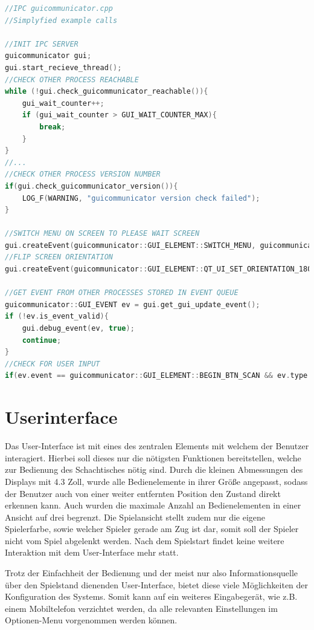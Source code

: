 \begin{lstlisting}[language={C++}]
//IPC guicommunicator.cpp
//Simplyfied example calls

//INIT IPC SERVER
guicommunicator gui;
gui.start_recieve_thread();
//CHECK OTHER PROCESS REACHABLE
while (!gui.check_guicommunicator_reachable()){
    gui_wait_counter++;
    if (gui_wait_counter > GUI_WAIT_COUNTER_MAX){
        break;
    }
}
//...
//CHECK OTHER PROCESS VERSION NUMBER
if(gui.check_guicommunicator_version()){
    LOG_F(WARNING, "guicommunicator version check failed");
}

//SWITCH MENU ON SCREEN TO PLEASE WAIT SCREEN
gui.createEvent(guicommunicator::GUI_ELEMENT::SWITCH_MENU, guicommunicator::GUI_VALUE_TYPE::PROCESSING_SCREEN);
//FLIP SCREEN ORIENTATION
gui.createEvent(guicommunicator::GUI_ELEMENT::QT_UI_SET_ORIENTATION_180, guicommunicator::GUI_VALUE_TYPE::ENABLED);

//GET EVENT FROM OTHER PROCESSES STORED IN EVENT QUEUE
guicommunicator::GUI_EVENT ev = gui.get_gui_update_event();
if (!ev.is_event_valid){
    gui.debug_event(ev, true);
    continue;
}
//CHECK FOR USER INPUT
if(ev.event == guicommunicator::GUI_ELEMENT::BEGIN_BTN_SCAN && ev.type == guicommunicator::GUI_VALUE_TYPE::CLICKED) {}
\end{lstlisting}

\hypertarget{userinterface}{%
\section{Userinterface}\label{userinterface}}

Das User-Interface ist mit eines des zentralen Elements mit welchem der
Benutzer interagiert. Hierbei soll dieses nur die nötigsten Funktionen
bereitstellen, welche zur Bedienung des Schachtisches nötig sind. Durch
die kleinen Abmessungen des Displays mit 4.3 Zoll, wurde alle
Bedienelemente in ihrer Größe angepasst, sodass der Benutzer auch von
einer weiter entfernten Position den Zustand direkt erkennen kann. Auch
wurden die maximale Anzahl an Bedienelementen in einer Ansicht auf drei
begrenzt. Die Spielansicht stellt zudem nur die eigene Spielerfarbe,
sowie welcher Spieler gerade am Zug ist dar, somit soll der Spieler
nicht vom Spiel abgelenkt werden. Nach dem Spielstart findet keine
weitere Interaktion mit dem User-Interface mehr statt.

Trotz der Einfachheit der Bedienung und der meist nur also
Informationsquelle über den Spielstand dienenden User-Interface, bietet
diese viele Möglichkeiten der Konfiguration des Systems. Somit kann auf
ein weiteres Eingabegerät, wie z.B. einem Mobiltelefon verzichtet
werden, da alle relevanten Einstellungen im Optionen-Menu vorgenommen
werden können.

